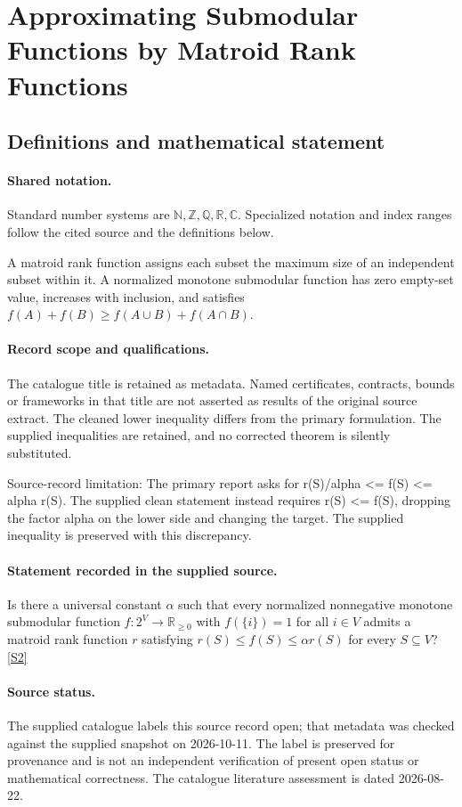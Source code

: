 \documentclass[11pt]{article}
\newcommand{\sref}[2]{\hyperlink{source:#1:#2}{[S#2]}}
\begin{document}
\section{Approximating Submodular Functions by Matroid Rank Functions}\label{statement}

\subsection{Definitions and mathematical statement}

\paragraph{Shared notation.}Standard number systems are $\mathbb N,\mathbb Z,\mathbb Q,\mathbb R,\mathbb C$. Specialized notation and index ranges follow the cited source and the definitions below.


A matroid rank function assigns each subset the maximum size of an independent subset within it. A normalized monotone submodular function has zero empty-set value, increases with inclusion, and satisfies $f(A)+f(B)\geq f(A\cup B)+f(A\cap B)$.
\paragraph{Record scope and qualifications.}
The catalogue title is retained as metadata. Named certificates, contracts, bounds or frameworks in that title are not asserted as results of the original source extract.
The cleaned lower inequality differs from the primary formulation. The supplied inequalities are retained, and no corrected theorem is silently substituted.

Source-record limitation: The primary report asks for r(S)/alpha <= f(S) <= alpha r(S). The supplied clean statement instead requires r(S) <= f(S), dropping the factor alpha on the lower side and changing the target. The supplied inequality is preserved with this discrepancy.
\paragraph{Statement recorded in the supplied source.}
Is there a universal constant $\alpha$ such that every normalized nonnegative monotone submodular function $f:2^V\to\mathbb R_{\geq0}$ with $f(\{i\})=1$ for all $i\in V$ admits a matroid rank function $r$ satisfying $r(S)\leq f(S)\leq\alpha r(S)$ for every $S\subseteq V$? \sref{statement}{2}
\paragraph{Source status.}
The supplied catalogue labels this source record open; that metadata was checked against the supplied snapshot on 2026-10-11. The label is preserved for provenance and is not an independent verification of present open status or mathematical correctness. The catalogue literature assessment is dated 2026-08-22.
\end{document}
